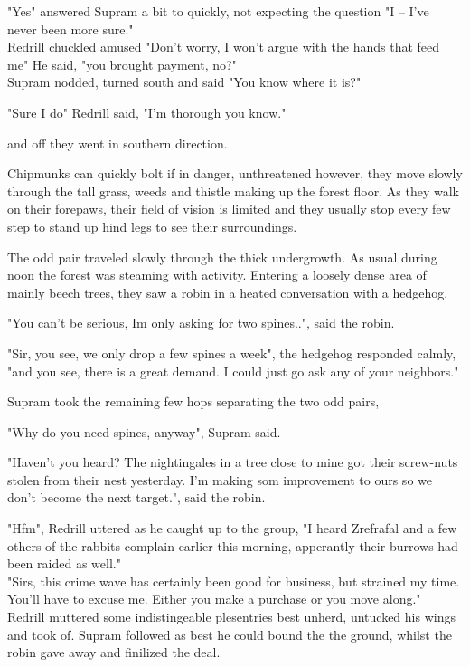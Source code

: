 \documentclass[smalldemyvopaper,11pt,twoside,onecolumn,openright,extrafontsizes]{memoir}
\newlength\drop
\begin{document}
"Yes" answered Supram a bit to quickly, not expecting the question "I -- I've never been more sure."\\

Redrill chuckled amused "Don't worry, I won't argue with the hands that feed me" He said, "you brought payment, no?"\\

Supram nodded, turned south and said "You know where it is?"

"Sure I do" Redrill said, "I'm thorough you know."

and off they went in southern direction.

Chipmunks can quickly bolt if in danger, unthreatened however, they move slowly through the tall grass, weeds and thistle making up the forest floor. As they walk on their forepaws, their field of vision is limited and they usually stop every few step to stand up hind legs to see their surroundings.

The odd pair traveled slowly through the thick undergrowth. As usual during noon the forest was steaming with activity.
Entering a loosely dense area of mainly beech trees, they saw a robin in a heated conversation with a hedgehog.

"You can't be serious, Im only asking for two spines..", said the robin.

"Sir, you see, we only drop a few spines a week", the hedgehog responded calmly, "and you see, there is a great demand. I could just go ask any of your neighbors."

Supram took the remaining few hops separating the two odd pairs,

"Why do you need spines, anyway", Supram said.

"Haven't you heard? The nightingales in a tree close to mine got their screw-nuts stolen from their nest yesterday. I'm making
som improvement to ours so we don't become the next target.", said the robin.

"Hfm", Redrill uttered as he caught up to the group, "I heard Zrefrafal and a few others of the rabbits complain earlier this morning, apperantly their burrows had been raided as well."\\

"Sirs, this crime wave has certainly been good for business, but strained my time. You'll have to excuse me. Either you make a purchase or you move along."\\

Redrill muttered some indistingeable plesentries best unherd, untucked his wings and took of. Supram followed as best he could bound the the ground, whilst the robin gave away and finilized the deal.\\
\end{document}
